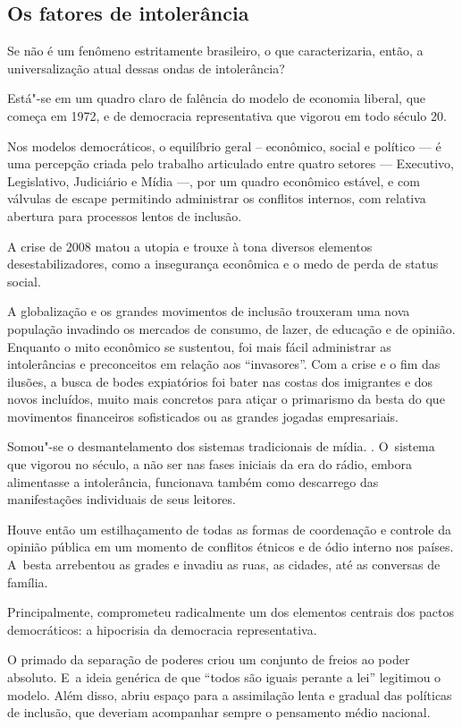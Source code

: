 \subsection{Os fatores de intolerância}

Se não é um fenômeno estritamente brasileiro, o que caracterizaria,
então, a universalização atual dessas ondas de intolerância?

Está"-se em um quadro claro de falência do modelo de economia liberal,
que começa em 1972, e de democracia representativa que vigorou em todo
século 20.

Nos modelos democráticos, o equilíbrio geral -- econômico, social e
político --- é uma percepção criada pelo trabalho articulado entre
quatro setores --- Executivo, Legislativo, Judiciário e Mídia \mbox{---,} por
um quadro econômico estável, e com válvulas de escape permitindo
administrar os conflitos internos, com relativa abertura para processos
lentos de inclusão.

A crise de 2008 matou a utopia e trouxe à tona diversos elementos
desestabilizadores, como a insegurança econômica e o medo de perda de
status social.

A globalização e os grandes movimentos de inclusão trouxeram uma nova
população invadindo os mercados de consumo, de lazer, de educação e de
opinião. Enquanto o mito econômico se sustentou, foi mais fácil
administrar as intolerâncias e preconceitos em relação aos
``invasores''. Com a crise e o fim das ilusões, a busca de bodes
expiatórios foi bater nas costas dos imigrantes e dos novos incluídos,
muito mais concretos para atiçar o primarismo da besta do que movimentos
financeiros sofisticados ou as grandes jogadas empresariais.

Somou"-se o desmantelamento dos sistemas tradicionais de mídia. . O~sistema que vigorou no século, a não ser nas fases iniciais da era do
rádio, embora alimentasse a intolerância, funcionava também como
descarrego das manifestações individuais de seus leitores.

Houve então um estilhaçamento de todas as formas de coordenação e
controle da opinião pública em um momento de conflitos étnicos e de ódio
interno nos países. A~besta arrebentou as grades e invadiu as ruas, as
cidades, até as conversas de família.

Principalmente, comprometeu radicalmente um dos elementos centrais dos
pactos democráticos: a hipocrisia da democracia representativa.

O primado da separação de poderes criou um conjunto de freios ao poder
absoluto. E~a ideia genérica de que ``todos são iguais perante a lei''
legitimou o modelo. Além disso, abriu espaço para a assimilação lenta e
gradual das políticas de inclusão, que deveriam acompanhar sempre o
pensamento médio nacional.

